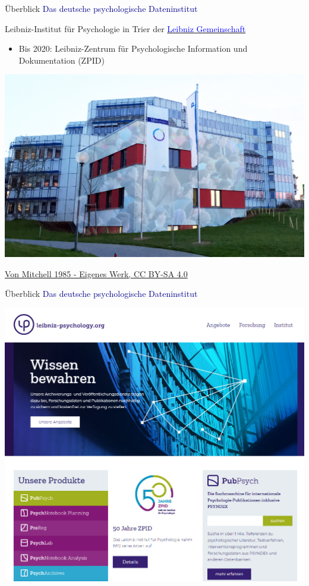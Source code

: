 \documentclass[
  8pt,
  ignorenonframetext,
]{beamer}
\providecommand{\tightlist}{%
  \setlength{\itemsep}{0pt}\setlength{\parskip}{0pt}}
\begin{document}
\begin{frame}{Überblick}
\protect\hypertarget{uxfcberblick-4}{}
\textcolor{darkblue}{Das deutsche psychologische Dateninstitut}

\small

Leibniz-Institut für Psychologie in Trier der
\href{https://www.leibniz-gemeinschaft.de/}{\textcolor{blue}{Leibniz Gemeinschaft}}

\begin{itemize}
\tightlist
\item
  Bis 2020: Leibniz-Zentrum für Psychologische Information und
  Dokumentation (ZPID)
\end{itemize}

\begin{center}\includegraphics[width=0.8\linewidth]{3_Abbildungen/pfm_3_zpid_haus} \end{center}

\flushright
\tiny

\href{https://commons.wikimedia.org/w/index.php?curid=7048518}{Von
Mitchell 1985 - Eigenes Werk, CC BY-SA 4.0}
\end{frame}

\begin{frame}{Überblick}
\protect\hypertarget{uxfcberblick-5}{}
\textcolor{darkblue}{Das deutsche psychologische Dateninstitut}

\begin{center}\includegraphics[width=0.65\linewidth]{3_Abbildungen/pfm_3_zpid} \end{center}
\end{frame}
\end{document}
